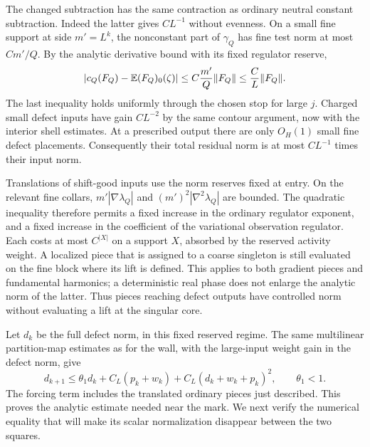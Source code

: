 The changed subtraction has the same contraction as ordinary
neutral constant subtraction.  Indeed the latter gives $CL^{-1}$
without evenness.  On a small fine support at side $m'=L^k$, the
nonconstant part of $\gamma_Q$ has fine test norm at most
$Cm'/Q$.  By the analytic derivative bound with its fixed
regulator reserve,
\begin{equation}\label{eq:mag-extraction-change}
 \left|c_Q(F_Q)-\mathbb E(F_Q)_0(\zeta)\right|
 \le C\frac{m'}{Q}\lVert F_Q\rVert
 \le \frac{C}{L}\lVert F_Q\rVert.
\end{equation}
The last inequality holds uniformly through the chosen stop for
large $j$.  Charged small defect inputs have gain $CL^{-2}$ by the
same contour argument, now with the interior shell estimates.
At a prescribed output there are only $O_H(1)$ small fine defect
placements.  Consequently their total residual norm is at most
$CL^{-1}$ times their input norm.

Translations of shift-good inputs use the norm reserves fixed at
entry.  On the relevant fine collars,
$m'|\nabla\lambda_Q|$ and $(m')^2|\nabla^2\lambda_Q|$ are bounded.
The quadratic inequality therefore permits a fixed increase in
the ordinary regulator exponent, and a fixed increase in the
coefficient of the variational observation regulator.  Each costs
at most $C^{|X|}$ on a support $X$, absorbed by the reserved activity
weight.  A localized piece that is assigned to a coarse singleton
is still evaluated on the fine block where its lift is defined.
This applies to both gradient pieces and fundamental harmonics;
a deterministic real phase does not enlarge the analytic norm of
the latter.  Thus pieces reaching defect outputs have controlled
norm without evaluating a lift at the singular core.

Let $d_k$ be the full defect norm, in this fixed reserved regime.
The same multilinear partition-map estimates as for the wall,
with the large-input weight gain in the defect norm, give
\begin{equation}\label{eq:mag-defect-recursion}
 d_{k+1}\le\theta_1d_k+C_L(p_k+w_k)
             +C_L(d_k+w_k+p_k)^2,
 \qquad\theta_1<1.
\end{equation}
The forcing term includes the translated ordinary pieces just
described.  This proves the analytic estimate needed near the mark.
We next verify the numerical equality that will make its scalar
normalization disappear between the two squares.

